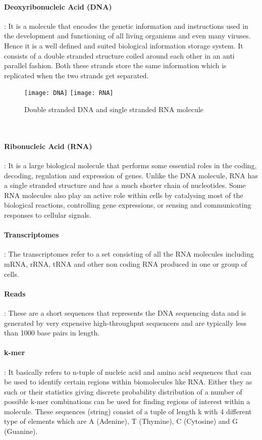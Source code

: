 \documentclass[plainarticle,zihtitle,english,final,hyperref,utf8]{zihpub}
\begin{document}
\paragraph{Deoxyribonucleic Acid (DNA)}: It is a molecule that encodes the genetic information and instructions used in the development and functioning of all living organisms and even many viruses. Hence it is a well defined and suited biological information storage system. It consists of a double stranded structure coiled around each other in an anti parallel fashion. Both these strands store the same information which is replicated when the two strands get separated.
\begin{figure}[h]
\center
\texttt{[image: DNA]}
\hspace{50pt}
\texttt{[image: RNA]}
\caption{Double stranded DNA and single stranded RNA molecule}
\end{figure}\\
\paragraph{Ribonucleic Acid (RNA)}: It is a large biological molecule that performs some essential roles in the coding, decoding, regulation and expression of genes. Unlike the DNA molecule, RNA has a single stranded structure and has a much shorter chain of nucleotides. Some RNA molecules also play an active role within cells by catalysing most of the biological reactions, controlling gene expressions, or sensing and communicating responses to cellular signals. 
\paragraph{Transcriptomes}: The transcriptomes refer to a set consisting of all the RNA molecules including mRNA, rRNA, tRNA and other non coding RNA produced in one or group of cells.
\paragraph{Reads}: These are a short sequences that represents the DNA sequencing data and is generated by very expensive high-throughput sequencers and are typically less than 1000 base pairs in length.
\paragraph{k-mer}: It basically refers to n-tuple of nucleic acid and amino acid sequences that can be used to identify certain regions within biomolecules like RNA. Either they as such or their statistics giving discrete probability distribution of a number of possible k-mer combinations can be used for finding regions of interest within a molecule. These sequences (string) consist of a tuple of length k with 4 different type of elements which are A (Adenine), T (Thymine), C (Cytosine) and G (Guanine).
\end{document}
